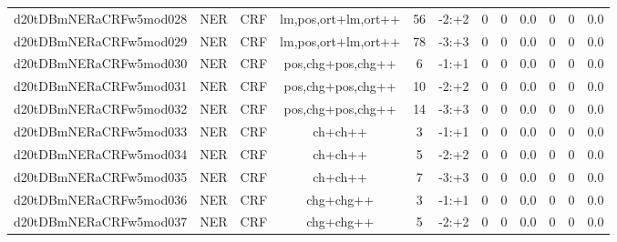 \documentclass[a4paper]{article}
\begin{document}
\begin{landscape}
\begin{center}
\begin{tabular}{ |c|c|c|c|c|c|c|c|c|c|c|c|}
 
 	
 	\small{ d20tDBmNERaCRFw5mod028 } & \small{ NER} & \small{  CRF }  & lm,pos,ort+lm,ort++  &  56 &  \small{  -2:+2 }  &  0 & 0 & 0.0  &  0 & 0 & 0.0 \\
 	

 
 	
 	\small{ d20tDBmNERaCRFw5mod029 } & \small{ NER} & \small{  CRF }  & lm,pos,ort+lm,ort++  &  78 &  \small{  -3:+3 }  &  0 & 0 & 0.0  &  0 & 0 & 0.0 \\
 	

 
 	
 	\small{ d20tDBmNERaCRFw5mod030 } & \small{ NER} & \small{  CRF }  & pos,chg+pos,chg++  &  6 &  \small{  -1:+1 }  &  0 & 0 & 0.0  &  0 & 0 & 0.0 \\
 	

 
 	
 	\small{ d20tDBmNERaCRFw5mod031 } & \small{ NER} & \small{  CRF }  & pos,chg+pos,chg++  &  10 &  \small{  -2:+2 }  &  0 & 0 & 0.0  &  0 & 0 & 0.0 \\
 	

 
 	
 	\small{ d20tDBmNERaCRFw5mod032 } & \small{ NER} & \small{  CRF }  & pos,chg+pos,chg++  &  14 &  \small{  -3:+3 }  &  0 & 0 & 0.0  &  0 & 0 & 0.0 \\
 	

 
 	
 	\small{ d20tDBmNERaCRFw5mod033 } & \small{ NER} & \small{  CRF }  & ch+ch++  &  3 &  \small{  -1:+1 }  &  0 & 0 & 0.0  &  0 & 0 & 0.0 \\
 	

 
 	
 	\small{ d20tDBmNERaCRFw5mod034 } & \small{ NER} & \small{  CRF }  & ch+ch++  &  5 &  \small{  -2:+2 }  &  0 & 0 & 0.0  &  0 & 0 & 0.0 \\
 	

 
 	
 	\small{ d20tDBmNERaCRFw5mod035 } & \small{ NER} & \small{  CRF }  & ch+ch++  &  7 &  \small{  -3:+3 }  &  0 & 0 & 0.0  &  0 & 0 & 0.0 \\
 	

 
 	
 	\small{ d20tDBmNERaCRFw5mod036 } & \small{ NER} & \small{  CRF }  & chg+chg++  &  3 &  \small{  -1:+1 }  &  0 & 0 & 0.0  &  0 & 0 & 0.0 \\
 	

 
 	
 	\small{ d20tDBmNERaCRFw5mod037 } & \small{ NER} & \small{  CRF }  & chg+chg++  &  5 &  \small{  -2:+2 }  &  0 & 0 & 0.0  &  0 & 0 & 0.0 \\
 	


\end{tabular}
\end{center}
\end{landscape}
\end{document}
